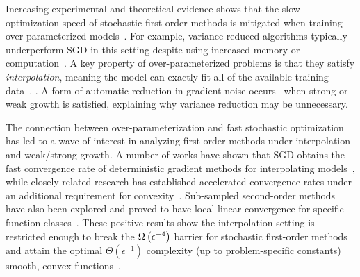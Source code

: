 Increasing experimental and theoretical evidence shows that the slow optimization speed of stochastic first-order methods is mitigated when training over-parameterized models~\citep{ma2018power, arora2018overparameterization, zhou2019analysis}.
For example, variance-reduced algorithms typically underperform \ac{SGD} in this setting despite using increased memory or computation~\citep{defazio2019effectiveness, ma2018power}. 
A key property of over-parameterized problems is that they satisfy \emph{interpolation}, meaning the model can exactly fit all of the available training data~\citep{belkin2019datainterp}.
. 
A form of automatic reduction in gradient noise occurs~\citep{liu2020accelerating} when strong or weak growth is satisfied, explaining why variance reduction may be unnecessary. 

The connection between over-parameterization and fast stochastic optimization has led to a wave of interest in analyzing first-order methods under interpolation and weak/strong growth.
A number of works have shown that \ac{SGD} obtains the fast convergence rate of deterministic gradient methods for interpolating models~\citep{schmidt2013fast, bassily2018exponential, vaswani2019fast, cevher2018linear, jain2018accelerating}, while closely related research has established accelerated convergence rates under an additional requirement for convexity~\citep{liu2020accelerating, vaswani2019fast, jain2018accelerating}.
Sub-sampled second-order methods have also been explored and proved to have local linear convergence for specific function classes~\citep{meng2020fastandfurious}.
These positive results show the interpolation setting is restricted enough to break the \( \Omega\left(\epsilon^{-4}\right) \) barrier for stochastic first-order methods and attain the optimal \( \Theta(\epsilon^{-1}) \) complexity (up to problem-specific constants)  smooth, convex functions~\citep{nemirovsky1985optimal, arjevani2016iteration}. 

